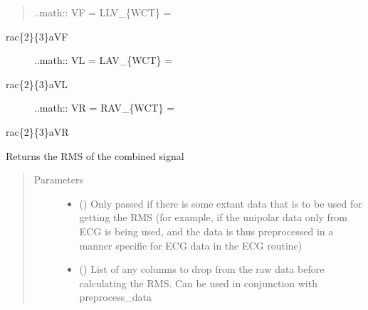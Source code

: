 \documentclass[letterpaper,10pt,english]{sphinxmanual}
\begin{document}
\begin{fulllineitems}
\begin{fulllineitems}
\begin{quote}
\sphinxAtStartPar
..math:: VF = LL\sphinxhyphen{}V\_\{WCT\} =
\end{quote}
\begin{description}
\item[{rac\{2\}\{3\}aVF}] \leavevmode
\sphinxAtStartPar
..math:: VL = LA\sphinxhyphen{}V\_\{WCT\} =

\item[{rac\{2\}\{3\}aVL}] \leavevmode
\sphinxAtStartPar
..math:: VR = RA\sphinxhyphen{}V\_\{WCT\} =

\end{description}

\sphinxAtStartPar
rac\{2\}\{3\}aVR

\end{fulllineitems}


\begin{fulllineitems}
\label{\detokenize{_autosummary/signalanalysis.general.Signal:id0}}
\sphinxAtStartPar
Returns the RMS of the combined signal
\begin{quote}\begin{description}
\item[{Parameters}] \leavevmode\begin{itemize}
\item {} 
\sphinxAtStartPar
{} (\sphinxstyleliteralemphasis{\sphinxupquote{, }}) \textendash{} Only passed if there is some extant data that is to be used for getting the RMS (for example,
if the unipolar data only from ECG is being used, and the data is thus preprocessed in a manner specific
for ECG data in the ECG routine)

\item {} 
\sphinxAtStartPar
{} (\sphinxstyleliteralemphasis{\sphinxupquote{, }}) \textendash{} List of any columns to drop from the raw data before calculating the RMS. Can be used in conjunction with
preprocess\_data


\end{itemize}
\end{description}
\end{quote}
\end{fulllineitems}
\end{fulllineitems}
\end{document}
